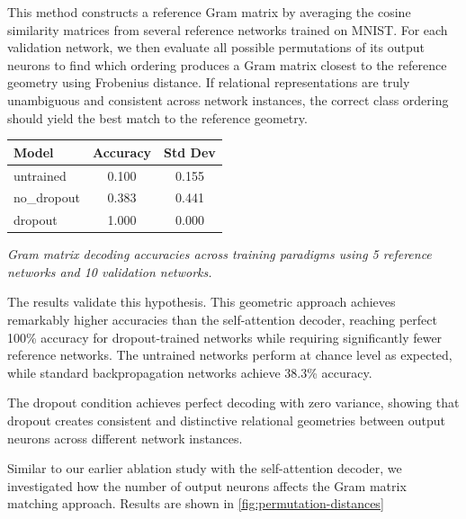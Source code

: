 \documentclass[11pt]{article}
\begin{document}
This method constructs a reference Gram matrix by averaging the cosine similarity matrices from several reference networks trained on MNIST. For each validation network, we then evaluate all possible permutations of its output neurons to find which ordering produces a Gram matrix closest to the reference geometry using Frobenius distance. If relational representations are truly unambiguous and consistent across network instances, the correct class ordering should yield the best match to the reference geometry.

\begin{center}
\begin{tabular}{lcc}
\toprule
Model & Accuracy & Std Dev \\
\midrule
untrained & 0.100 & 0.155 \\
no\_dropout & 0.383 & 0.441 \\
dropout & 1.000 & 0.000 \\
\bottomrule
\end{tabular}
\end{center}

\textit{Gram matrix decoding accuracies across training paradigms using 5 reference networks and 10 validation networks.}


The results validate this hypothesis. This geometric approach achieves remarkably higher accuracies than the self-attention decoder, reaching perfect 100\% accuracy for dropout-trained networks while requiring significantly fewer reference networks. The untrained networks perform at chance level as expected, while standard backpropagation networks achieve 38.3\% accuracy.

The dropout condition achieves perfect decoding with zero variance, showing that dropout creates consistent and distinctive relational geometries between output neurons across different network instances.

Similar to our earlier ablation study with the self-attention decoder, we investigated how the number of output neurons affects the Gram matrix matching approach. Results are shown in \ref{fig:permutation-distances}
\end{document}
